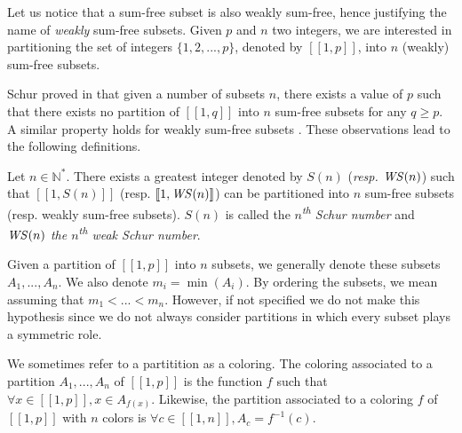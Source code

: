 Let us notice that a sum-free subset is also weakly sum-free, hence justifying the name of \textit{weakly} sum-free
subsets. Given \(p\) and \(n\) two integers, we are interested in partitioning the set of integers \(\{1, 2, ..., p\}\), 
denoted by \([\![1,p]\!]\), into \(n\) (weakly) sum-free subsets.

\par
Schur proved in \cite{Schur1917} that given a number of subsets \(n\), there exists a value of \(p\)
such that there exists no partition of \([\![1,q]\!]\) into \(n\) sum-free subsets for any \(q \geqslant p\). A similar
property holds for weakly sum-free subsets \cite{Irving1973}. These observations lead to the following definitions.

\begin{definition}
Let \(n \in \mathbb{N}^*\). There exists a greatest integer denoted by \(S(n)\) (\textit{resp. \(\mathit{WS} (n)\)}) such that
\([\![1,S(n)]\!]\) (resp. \([\![1, \mathit{WS} (n)]\!]\)) can be partitioned into \(n\) sum-free subsets (resp. weakly sum-free
subsets). \(S(n)\) is called the \textit{\(n\)\textsuperscript{th} Schur number} and \textit{\(\mathit{WS} (n)\) the
\(n\)\textsuperscript{th} weak Schur number}.
\end{definition}

Given a partition of \([\![1, p]\!]\) into \(n\) subsets, we generally denote these subsets \(A_1, ..., A_n\). We also denote
\(m_i = \min(A_i)\). By ordering the subsets, we mean assuming that \(m_1 < ... < m_n\). However, if not specified we do 
not make this hypothesis since we do not always consider partitions in which every subset plays a symmetric role.

\begin{definition}
We sometimes refer to a partitition as a coloring. The coloring associated to a partition \(A_1, ..., A_n\) of 
\([\![1, p]\!]\) is the function \(f\) such that \(\forall x \in [\![1, p]\!], x \in A_{f(x)}\). Likewise, the partition associated to
a coloring \(f\) of \([\![1, p]\!]\) with \(n\) colors is \(\forall c \in [\![1, n]\!], A_c = f^{-1}(c)\).
\end{definition}
